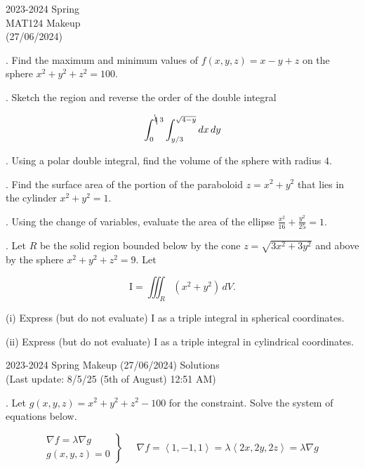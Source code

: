 \documentclass{article}
\begin{document}
\pagestyle{empty}
\large

\begin{center}
2023-2024 Spring \\MAT124 Makeup\\(27/06/2024)
\end{center}

. Find the maximum and minimum values of $f(x,y,z)=x-y+z$ on the sphere $x^2+y^2+z^2=100$.

\hfill

. Sketch the region and reverse the order of the double integral

\[\int_0^{\bcancel4\:3}\int_{y/3}^{\sqrt{4-y}}dx\,dy\]

\hfill

. Using a polar double integral, find the volume of the sphere with radius $4$.

\hfill

. Find the surface area of the portion of the paraboloid $z=x^2+y^2$ that lies in the cylinder $x^2+y^2=1$.

\hfill

. Using the change of variables, evaluate the area of the ellipse $\displaystyle\frac{x^2}{16}+\frac{y^2}{25}=1$.

\hfill

. Let $R$ be the solid region bounded below by the cone $z=\sqrt{3x^2+3y^2}$ and above by the sphere $x^2+y^2+z^2=9$. Let

\[\mathrm{I}=\iiint_R(x^2+y^2)\,dV.\]

\hfill

\noindent (i) Express (but do not evaluate) $\mathrm{I}$ as a triple integral in spherical coordinates.

\hfill

\noindent (ii) Express (but do not evaluate) $\mathrm{I}$ as a triple integral in cylindrical coordinates.

\newpage

\begin{center}
2023-2024 Spring Makeup (27/06/2024) Solutions\\
(Last update: 8/5/25 (5th of August) 12:51 AM)
\end{center}

. Let $g(x,y,z)=x^2+y^2+z^2-100$ for the constraint. Solve the system of equations below.

\[
\left.
\begin{array}{l}
\displaystyle\nabla f=\lambda\nabla g \\
\displaystyle g(x,y,z)=0
\end{array}
\right\}\quad
\begin{array}{c}
\nabla f=\left\langle1,-1,1\right\rangle=\lambda\left\langle2x,2y,2z\right\rangle=\lambda\nabla g
\end{array}
\]
\end{document}
